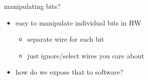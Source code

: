 

\begin{frame}{manipulating bits?}
    \begin{itemize}
    \item easy to manipulate individual bits in HW
        \begin{itemize}
        \item separate wire for each bit
        \item just ignore/select wires you care about
        \end{itemize}
    \item how do we expose that to software?
    \end{itemize}
\end{frame}


